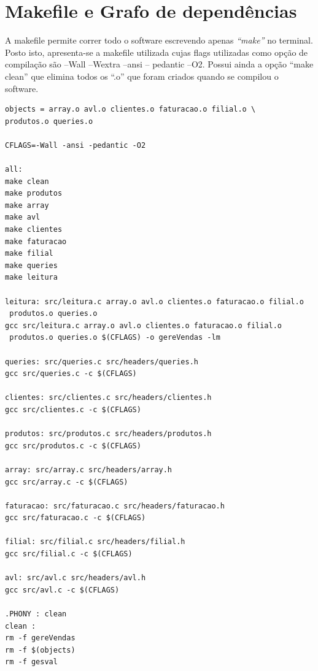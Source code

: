 \chapter{Makefile e Grafo de dependências}
A makefile permite correr todo o software escrevendo apenas \textit{“make”} no terminal. Posto isto, apresenta-se a makefile utilizada cujas flags utilizadas como opção de compilação são –Wall –Wextra –ansi – pedantic –O2.
Possui ainda a opção “make clean” que elimina todos os “.o” que foram criados quando se compilou o software.

\begin{verbatim}
objects = array.o avl.o clientes.o faturacao.o filial.o \
produtos.o queries.o 

CFLAGS=-Wall -ansi -pedantic -O2

all:
make clean
make produtos
make array
make avl
make clientes
make faturacao
make filial
make queries
make leitura

leitura: src/leitura.c array.o avl.o clientes.o faturacao.o filial.o
 produtos.o queries.o 
gcc src/leitura.c array.o avl.o clientes.o faturacao.o filial.o
 produtos.o queries.o $(CFLAGS) -o gereVendas -lm

queries: src/queries.c src/headers/queries.h
gcc src/queries.c -c $(CFLAGS)

clientes: src/clientes.c src/headers/clientes.h
gcc src/clientes.c -c $(CFLAGS)

produtos: src/produtos.c src/headers/produtos.h
gcc src/produtos.c -c $(CFLAGS)

array: src/array.c src/headers/array.h
gcc src/array.c -c $(CFLAGS)

faturacao: src/faturacao.c src/headers/faturacao.h
gcc src/faturacao.c -c $(CFLAGS)

filial: src/filial.c src/headers/filial.h
gcc src/filial.c -c $(CFLAGS)

avl: src/avl.c src/headers/avl.h
gcc src/avl.c -c $(CFLAGS)

.PHONY : clean
clean :
rm -f gereVendas
rm -f $(objects)
rm -f gesval
\end{verbatim}

